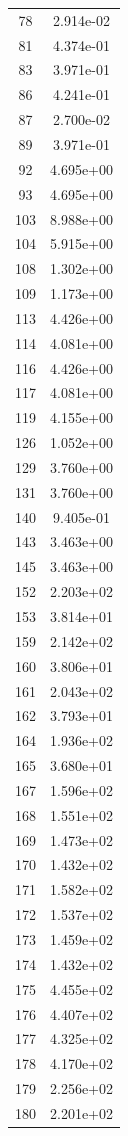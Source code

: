 \documentclass[12pt]{article}
\begin{document}
\begin{longtable}{@{}cc@{}}
78 & 2.914e-02 \\
81 & 4.374e-01 \\
83 & 3.971e-01 \\
86 & 4.241e-01 \\
87 & 2.700e-02 \\
89 & 3.971e-01 \\
92 & 4.695e+00 \\
93 & 4.695e+00 \\
103 & 8.988e+00 \\
104 & 5.915e+00 \\
108 & 1.302e+00 \\
109 & 1.173e+00 \\
113 & 4.426e+00 \\
114 & 4.081e+00 \\
116 & 4.426e+00 \\
117 & 4.081e+00 \\
119 & 4.155e+00 \\
126 & 1.052e+00 \\
129 & 3.760e+00 \\
131 & 3.760e+00 \\
140 & 9.405e-01 \\
143 & 3.463e+00 \\
145 & 3.463e+00 \\
152 & 2.203e+02 \\
153 & 3.814e+01 \\
159 & 2.142e+02 \\
160 & 3.806e+01 \\
161 & 2.043e+02 \\
162 & 3.793e+01 \\
164 & 1.936e+02 \\
165 & 3.680e+01 \\
167 & 1.596e+02 \\
168 & 1.551e+02 \\
169 & 1.473e+02 \\
170 & 1.432e+02 \\
171 & 1.582e+02 \\
172 & 1.537e+02 \\
173 & 1.459e+02 \\
174 & 1.432e+02 \\
175 & 4.455e+02 \\
176 & 4.407e+02 \\
177 & 4.325e+02 \\
178 & 4.170e+02 \\
179 & 2.256e+02 \\
180 & 2.201e+02 \\

\end{longtable}
\end{document}
